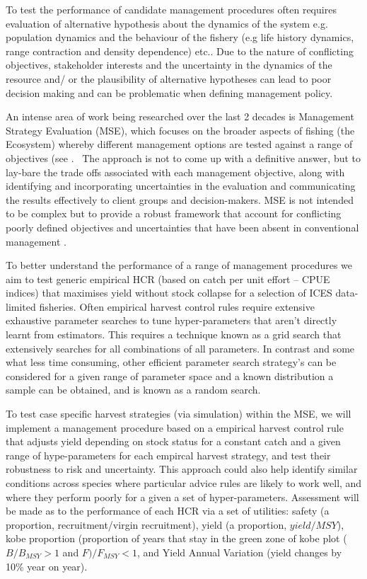 \documentclass[preprint,12pt]{elsarticle}
\begin{document}
To test the performance of candidate management procedures often requires evaluation of alternative hypothesis about the dynamics of the system e.g. population dynamics and the behaviour of the fishery (e.g life history dynamics, range contraction and density dependence) etc.. Due to the nature of conflicting objectives, stakeholder interests and the uncertainty in the dynamics of the resource and/ or the plausibility of alternative hypotheses can lead to poor decision making and can be problematic when defining management policy.

An intense area of work being researched over the last 2 decades is Management Strategy Evaluation (MSE), which focuses on the broader aspects of fishing (the Ecosystem) whereby different management options are tested against a range of objectives (see \cite{Kell et al., 2007}.  The approach is not to come up with a definitive answer, but to lay-bare the trade offs associated with each management objective, along with identifying and incorporating uncertainties in the evaluation and communicating the results effectively to client groups and decision-makers. MSE is not intended to be complex but to provide a robust framework that account for conflicting poorly defined objectives and uncertainties that have been absent in conventional management \cite{Kell et al., 2007}.  

To better understand the performance of a range of management procedures we aim to test generic empirical HCR (based on catch per unit effort – CPUE indices) that maximises yield without stock collapse for  a selection of ICES data-limited fisheries. Often empirical harvest control rules require extensive exhaustive parameter searches to tune hyper-parameters that aren’t directly learnt from estimators.  This requires a technique known as a grid search that extensively searches for all combinations of all parameters. In contrast and some what less time consuming, other efficient parameter search strategy’s can be considered for a given range of parameter space and a known distribution a sample can be obtained, and is known as a random search.  

To test case specific harvest strategies (via simulation) within the MSE, we will implement a management procedure based on a empirical harvest control rule that adjusts yield depending on stock status for a constant catch and a given range of hype-parameters for each empircal harvest strategy, and test their robustness to risk and uncertainty.  This approach could also help identify similar conditions across species where particular advice rules are likely to work well, and where they perform poorly for a given a set of hyper-parameters. Assessment will be made as to the performance of each HCR via a set of utilities: safety (a proportion, recruitment/virgin recruitment), yield (a proportion, $yield/MSY$), kobe proportion (proportion of years that stay in the green zone of kobe plot ($B/B_{MSY} >1$ and $F)/F_{MSY} < 1$, and Yield Annual Variation (yield changes by 10\% year on year). 
\end{document}
